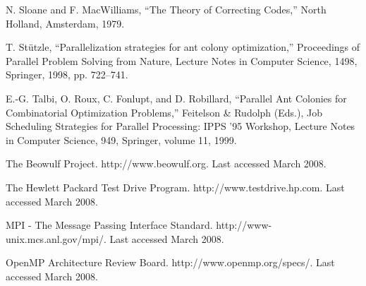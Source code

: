 \documentclass[11pt]{article}
\begin{document}
\begin{thebibliography}{99}
N. Sloane and F. MacWilliams, ``The Theory of Correcting Codes,'' North Holland, Amsterdam, 1979.

T. St\"utzle, ``Parallelization strategies for ant colony optimization,'' Proceedings of Parallel Problem Solving from Nature, Lecture Notes in Computer Science, 1498, Springer, 1998, pp. 722--741.



E.-G. Talbi, O. Roux, C. Fonlupt, and D. Robillard, ``Parallel Ant Colonies for Combinatorial Optimization Problems,'' Feitelson 
\& Rudolph (Eds.), Job Scheduling Strategies for Parallel Processing: IPPS ’95 Workshop, Lecture Notes in Computer Science, 949, Springer, volume 11, 1999.


The Beowulf Project. http://www.beowulf.org. Last accessed March 2008.

The Hewlett Packard Test Drive Program. http://www.testdrive.hp.com. Last accessed March 2008.


MPI - The Message Passing Interface Standard. http://www-unix.mcs.anl.gov/mpi/. Last accessed March 2008.


OpenMP Architecture Review Board. http://www.openmp.org/specs/. Last accessed March 2008.

\end{thebibliography}
\end{document}
